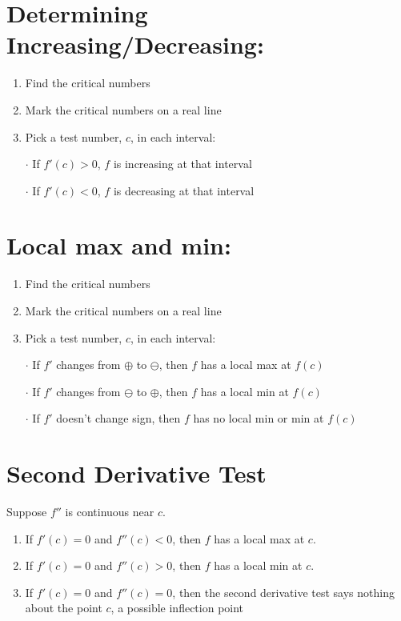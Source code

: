 \documentclass[12pt]{article}
\begin{document}
\section{Determining Increasing/Decreasing: }
\begin{enumerate}
    \item Find the critical numbers
    \item Mark the critical numbers on a real line
    \item Pick a test number, $c$, in each interval:
    \item[$\cdot$] If $f'(c) > 0$, $f$ is increasing at that interval
    \item[$\cdot$] If $f'(c) < 0$, $f$ is decreasing at that interval
\end{enumerate}

\section{Local max and min: }
\begin{enumerate}
    \item Find the critical numbers
    \item Mark the critical numbers on a real line
    
    \item Pick a test number, $c$, in each interval:
    \item[$\cdot$] If $f'$ changes from $\oplus$ to $\ominus$, then $f$ has a local max at $f(c)$
    \item[$\cdot$] If $f'$ changes from $\ominus$ to $\oplus$, then $f$ has a local min at $f(c)$
    \item[$\cdot$] If $f'$ doesn't change sign, then $f$ has no local min or min at $f(c)$
\end{enumerate}

\section{Second Derivative Test} Suppose $f''$ is continuous near $c$. 
\begin{enumerate}
    \item If $f'(c) = 0$ and $f''(c) < 0$, then $f$ has a local max at $c$.
    \item If $f'(c) = 0$ and $f''(c) > 0$, then $f$ has a local min at $c$.
    \item If $f'(c) = 0$ and $f''(c) = 0$, then the second derivative test says nothing about the point $c$, a possible inflection point
\end{enumerate}
\end{document}
